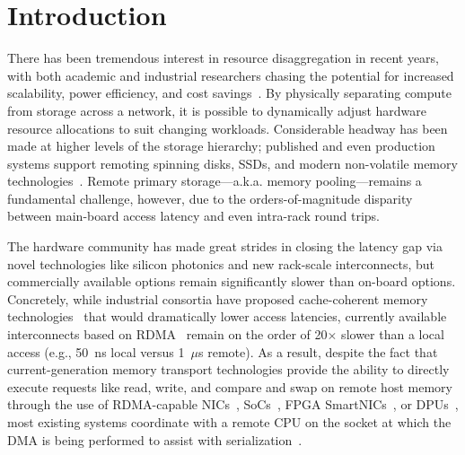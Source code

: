 \section{Introduction}

There has been tremendous interest in resource disaggregation in
recent years, with both academic and industrial researchers chasing
the potential for increased scalability, power efficiency, and cost
savings~\cite{blade-server,fastswap,rethinking,the-machine,requirements,clio-arxiv,firebox,leap,zombieland,storm,aifm,legoos,supernic}.
By physically separating compute from storage across a network, it is
possible to dynamically adjust hardware resource allocations to suit
changing workloads.  Considerable headway has been made at higher
levels of the storage hierarchy; published and even production systems
support remoting spinning disks, SSDs, and modern non-volatile
memory technologies~\cite{decible}.  Remote primary storage---a.k.a.
memory pooling---remains a fundamental challenge, however, due to the
orders-of-magnitude disparity between main-board access latency and
even intra-rack round trips.



The hardware community has made great strides in closing the latency
gap via novel technologies like silicon photonics and new rack-scale
interconnects, but commercially available options remain significantly
slower than on-board options.  Concretely, while industrial consortia
have proposed cache-coherent memory technologies~\cite{genz,cxl} that
would dramatically lower access latencies, currently available
interconnects based on RDMA~\cite{infiniband-spec}
remain on the order of 20$\times$ slower than a local access (e.g.,
50~ns local versus 1~$\mu$s remote).  As a result, despite the fact
that current-generation memory transport technologies provide the
ability to directly execute requests like read, write, and compare and
swap on remote host memory through the use of RDMA-capable
NICs~\cite{connectx}, SoCs~\cite{cavium}, FPGA
SmartNICs~\cite{corundum,kv-direct}, or DPUs~\cite{fungible}, most
existing systems coordinate with a remote CPU on the socket at which
the DMA is being performed to assist with
serialization~\cite{cliquemap,erpc,herd,sonuma,storm}.


